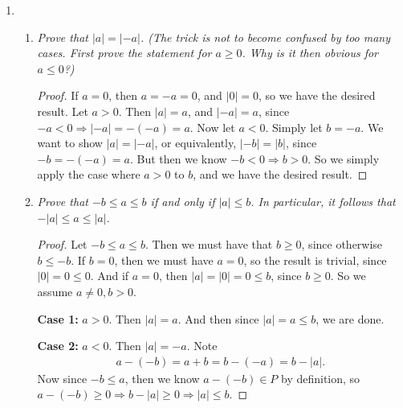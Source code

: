 \documentclass[12pt]{amsbook}
\theoremstyle{plain}
\numberwithin{section}{chapter}
\numberwithin{equation}{chapter}
\theoremstyle{definition}
\theoremstyle{remark}
\theoremstyle{plain}
\newcommand{\bb}{\vspace{3mm}}
\newcommand{\bee}{\begin{equation}\begin{aligned}}
\newcommand{\eee}{\end{aligned}\end{equation}}
\renewcommand{\leq}{\leqslant}
\renewcommand{\geq}{\geqslant}
\begin{document}
\begin{enumerate}[label=\roman*)]
\bb
\item 
\begin{enumerate}
\item \textit{Prove that $|a| = |-a|$. (The trick is not to become confused by too many cases. First prove the statement for $a \geq 0$. Why is it then obvious for $a \leq 0$?)}
\begin{proof}
If $a = 0$, then $a = -a = 0$, and $|0| = 0$, so we have the desired result. 
Let $a > 0$. Then $|a| = a$, and $|-a| = a$, since $-a < 0 \Rightarrow |-a| = -(-a) = a$. Now let $a < 0$. Simply let $b = -a$. We want to show $|a| = |-a|$, or equivalently, $|-b| = |b|$, since $-b = -(-a) = a$. But then we know $-b < 0 \Rightarrow b > 0$. So we simply apply the case where $a > 0$ to $b$, and we have the desired result. 
\end{proof}

\bb
\item \textit{Prove that $-b \leq a \leq b$ if and only if $|a| \leq b$. In particular, it follows that $-|a| \leq a \leq |a|$. }
\begin{proof}
Let $-b \leq a \leq b$. Then we must have that $b \geq 0$, since otherwise $b \leq -b$. If $b = 0$, then we must have $a = 0$, so the result is trivial, since $|0| = 0 \leq 0$. And if $a = 0$, then $|a| = |0| = 0 \leq b$, since $b \geq 0$. So we assume $a \neq 0, b > 0$. 

\textbf{Case 1:} $a > 0$. Then $|a| = a$. And then since $|a| = a \leq b$, we are done. 

\textbf{Case 2:} $a < 0$. Then $|a| = -a$. Note 
\bee
a - (-b) = a + b = b - (-a) = b - |a|. 
\eee
Now since $-b \leq a$, then we know $a -(-b) \in P$ by definition, so $a - (-b) \geq 0 \Rightarrow b - |a| \geq 0 \Rightarrow |a| \leq b$. 
\end{proof}
\end{enumerate}
\end{enumerate}
\end{document}
